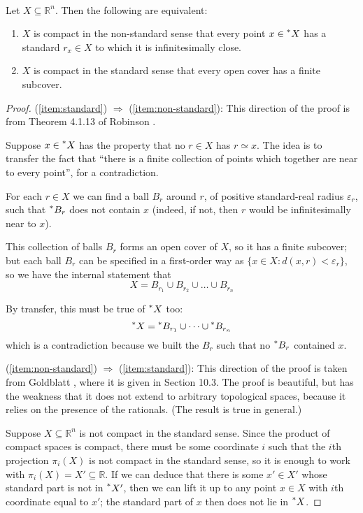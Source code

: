 \documentclass[11pt]{amsart}
\theoremstyle{remark}
\newcommand{\hyp}[1][\mathbb{R}]{\prescript{*}{}{#1}}
\newcommand{\near}{\simeq}
\begin{document}
\

\begin{thm} Let $X \subseteq \mathbb{R}^n$. Then the following are equivalent:
\begin{enumerate} 
\item \label{item:non-standard} $X$ is compact in the non-standard sense that every point $x \in \hyp[X]$ has a standard $r_x \in X$ to which it is infinitesimally close.
\item \label{item:standard} $X$ is compact in the standard sense that every open cover has a finite subcover.
\end{enumerate}
\end{thm}
\begin{proof}
(\ref{item:standard}) $\Rightarrow$ (\ref{item:non-standard}):
This direction of the proof is from Theorem 4.1.13 of Robinson \cite{robinson}.

Suppose $x \in \hyp[X]$ has the property that no $r \in X$ has $r \near x$.
The idea is to transfer the fact that ``there is a finite collection of points which together are near to every point'', for a contradiction.

For each $r \in X$ we can find a ball $B_r$ around $r$, of positive standard-real radius $\varepsilon_r$, such that $\hyp[B_r]$ does not contain $x$
(indeed, if not, then $r$ would be infinitesimally near to $x$).

This collection of balls $B_r$ forms an open cover of $X$, so it has a finite subcover;
but each ball $B_r$ can be specified in a first-order way as $\{ x \in X: d(x, r) < \varepsilon_r \}$, so we have the internal statement that $$X = B_{r_1} \cup B_{r_2} \cup \dots \cup B_{r_n}$$

By transfer, this must be true of $\hyp[X]$ too: $$\hyp[X] = \hyp[B_{r_1}] \cup \dots \cup \hyp[B_{r_n}]$$ which is a contradiction because we built the $B_r$ such that no $\hyp[B_r]$ contained $x$.

(\ref{item:non-standard}) $\Rightarrow$ (\ref{item:standard}):
This direction of the proof is taken from Goldblatt \cite{goldblatt}, where it is given in Section 10.3.
The proof is beautiful, but has the weakness that it does not extend to arbitrary topological spaces, because it relies on the presence of the rationals.
(The result is true in general.)

Suppose $X \subseteq \mathbb{R}^n$ is not compact in the standard sense.
Since the product of compact spaces is compact, there must be some coordinate $i$ such that the $i$th projection $\pi_i(X)$ is not compact in the standard sense, so it is enough to work with $\pi_i(X) = X' \subseteq \mathbb{R}$.
If we can deduce that there is some $x' \in X'$ whose standard part is not in $\hyp[X']$, then we can lift it up to any point $x \in X$ with $i$th coordinate equal to $x'$; the standard part of $x$ then does not lie in $\hyp[X]$.


\end{proof}
\end{document}
